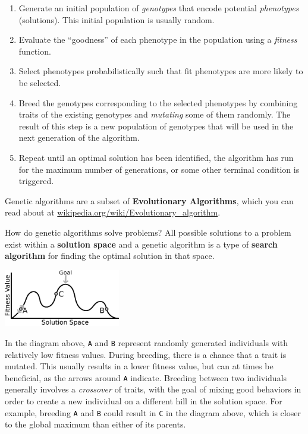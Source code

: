 

\begin{enumerate}
  \item Generate an initial population of {\em genotypes} that encode potential
  {\em phenotypes} (solutions). This initial population is usually random. %

  \item Evaluate the ``goodness'' of each phenotype in the population using a 
  {\em fitness} function.

  \item Select phenotypes probabilistically such that fit phenotypes 
  are more likely to be selected.

  \item Breed the genotypes corresponding to the selected phenotypes by combining 
  traits of the existing genotypes and {\em mutating} some of them randomly. %
  The result of this step is a new population of genotypes that will be used in
  the next generation of the algorithm.

  \item Repeat until an optimal solution has been identified, the algorithm has run for the maximum 
  number of generations, or some other terminal condition is triggered.

\end{enumerate}

Genetic algorithms are a subset of {\bf Evolutionary Algorithms}, which you can
read about at \url{wikipedia.org/wiki/Evolutionary_algorithm}.

How do genetic algorithms solve problems? All possible solutions to a problem
exist within a {\bf solution space} and a genetic algorithm is a type of
{\bf search algorithm} for finding the optimal solution in that space.

\beforefig
\centerline{\includegraphics[width=2in]{./pycritters_figs/GeneticAlgStateSpace.eps}}
\afterfig

In the diagram above, {\tt A} and {\tt B} represent randomly generated
individuals with relatively low fitness values. During breeding, there is a
chance that a trait is mutated. This usually results in a lower fitness value,
but can at times be beneficial, as the arrows around {\tt A}
indicate. Breeding between two individuals
generally involves a {\em crossover} of traits, 
with the goal of mixing good behaviors in order to create a new individual 
on a different hill in the solution space. For example, breeding {\tt A} 
and {\tt B} could result in {\tt C} in the diagram above, which is closer 
to the global maximum than either of its parents.
 
